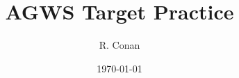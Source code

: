 \documentclass{article}
\begin{document}
\title{AGWS Target Practice}
\author{R. Conan}
\date{\today}
\maketitle

\tableofcontents


\end{document}
